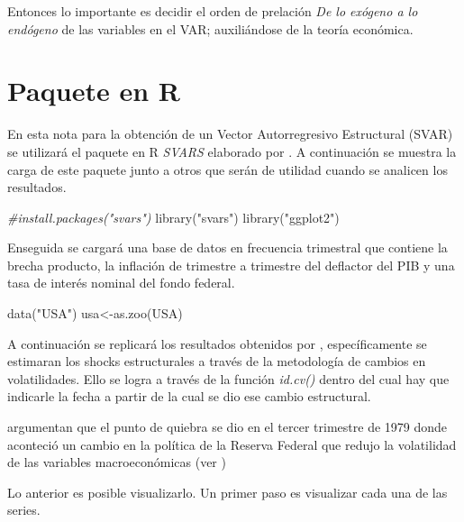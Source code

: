 \documentclass[
]{book}
\newenvironment{Shaded}{\begin{snugshade}}{\end{snugshade}}
\newcommand{\CommentTok}[1]{\textcolor[rgb]{0.56,0.35,0.01}{\textit{#1}}}
\newcommand{\FunctionTok}[1]{\textcolor[rgb]{0.00,0.00,0.00}{#1}}
\newcommand{\NormalTok}[1]{#1}
\newcommand{\OtherTok}[1]{\textcolor[rgb]{0.56,0.35,0.01}{#1}}
\newcommand{\StringTok}[1]{\textcolor[rgb]{0.31,0.60,0.02}{#1}}
\begin{document}
Entonces lo importante es decidir el orden de prelación \emph{De lo exógeno a lo endógeno} de las variables en el VAR; auxiliándose de la teoría económica.

\hypertarget{paquete-en-r}{%
\section{Paquete en R}\label{paquete-en-r}}

En esta nota para la obtención de un Vector Autorregresivo Estructural (SVAR) se utilizará el paquete en R \emph{SVARS} elaborado por \citet{SVAR21}. A continuación se muestra la carga de este paquete junto a otros que serán de utilidad cuando se analicen los resultados.

\begin{Shaded}
\begin{Highlighting}[]
\CommentTok{\#install.packages("svars")}
\FunctionTok{library}\NormalTok{(}\StringTok{"svars"}\NormalTok{)}
\FunctionTok{library}\NormalTok{(}\StringTok{"ggplot2"}\NormalTok{)}
\end{Highlighting}
\end{Shaded}

Enseguida se cargará una base de datos en frecuencia trimestral que contiene la brecha producto, la inflación de trimestre a trimestre del deflactor del PIB y una tasa de interés nominal del fondo federal.

\begin{Shaded}
\begin{Highlighting}[]
\FunctionTok{data}\NormalTok{(}\StringTok{"USA"}\NormalTok{)}
\NormalTok{usa}\OtherTok{\textless{}{-}}\FunctionTok{as.zoo}\NormalTok{(USA)}
\end{Highlighting}
\end{Shaded}

A continuación se replicará los resultados obtenidos por \citet{Herwartz2016}, específicamente se estimaran los shocks estructurales a través de la metodología de cambios en volatilidades. Ello se logra a través de la función \emph{id.cv()} dentro del cual hay que indicarle la fecha a partir de la cual se dio ese cambio estructural.

\citet{Herwartz2016} argumentan que el punto de quiebra se dio en el tercer trimestre de 1979 donde aconteció un cambio en la política de la Reserva Federal que redujo la volatilidad de las variables macroeconómicas (ver \citet{Stock2003})

Lo anterior es posible visualizarlo.
Un primer paso es visualizar cada una de las series.
\end{document}
